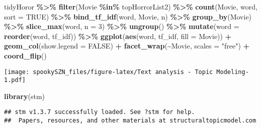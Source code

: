 \documentclass[
]{article}
\newenvironment{Shaded}{\begin{snugshade}}{\end{snugshade}}
\newcommand{\AttributeTok}[1]{\textcolor[rgb]{0.13,0.29,0.53}{#1}}
\newcommand{\ConstantTok}[1]{\textcolor[rgb]{0.56,0.35,0.01}{#1}}
\newcommand{\DecValTok}[1]{\textcolor[rgb]{0.00,0.00,0.81}{#1}}
\newcommand{\FunctionTok}[1]{\textcolor[rgb]{0.13,0.29,0.53}{\textbf{#1}}}
\newcommand{\NormalTok}[1]{#1}
\newcommand{\SpecialCharTok}[1]{\textcolor[rgb]{0.81,0.36,0.00}{\textbf{#1}}}
\newcommand{\StringTok}[1]{\textcolor[rgb]{0.31,0.60,0.02}{#1}}
\begin{document}
\begin{Shaded}
\begin{Highlighting}[]
\NormalTok{tidyHoror }\SpecialCharTok{\%\textgreater{}\%} 
  \FunctionTok{filter}\NormalTok{(Movie }\SpecialCharTok{\%in\%}\NormalTok{ topHorrorList2) }\SpecialCharTok{\%\textgreater{}\%} 
  \FunctionTok{count}\NormalTok{(Movie, word, }\AttributeTok{sort =} \ConstantTok{TRUE}\NormalTok{) }\SpecialCharTok{\%\textgreater{}\%} 
  \FunctionTok{bind\_tf\_idf}\NormalTok{(word, Movie, n) }\SpecialCharTok{\%\textgreater{}\%} 
  \FunctionTok{group\_by}\NormalTok{(Movie) }\SpecialCharTok{\%\textgreater{}\%} 
  \FunctionTok{slice\_max}\NormalTok{(word, }\AttributeTok{n =} \DecValTok{3}\NormalTok{) }\SpecialCharTok{\%\textgreater{}\%} 
  \FunctionTok{ungroup}\NormalTok{() }\SpecialCharTok{\%\textgreater{}\%} 
  \FunctionTok{mutate}\NormalTok{(}\AttributeTok{word =} \FunctionTok{reorder}\NormalTok{(word, tf\_idf)) }\SpecialCharTok{\%\textgreater{}\%} 
  \FunctionTok{ggplot}\NormalTok{(}\FunctionTok{aes}\NormalTok{(word, tf\_idf, }\AttributeTok{fill =}\NormalTok{ Movie)) }\SpecialCharTok{+} 
  \FunctionTok{geom\_col}\NormalTok{(}\AttributeTok{show.legend =} \ConstantTok{FALSE}\NormalTok{) }\SpecialCharTok{+} 
  \FunctionTok{facet\_wrap}\NormalTok{(}\SpecialCharTok{\textasciitilde{}}\NormalTok{Movie, }\AttributeTok{scales =} \StringTok{"free"}\NormalTok{) }\SpecialCharTok{+} 
  \FunctionTok{coord\_flip}\NormalTok{()}
\end{Highlighting}
\end{Shaded}

\texttt{[image: spookySZN\_files/figure-latex/Text analysis - Topic Modeling-1.pdf]}

\begin{Shaded}
\begin{Highlighting}[]
\FunctionTok{library}\NormalTok{(stm)}
\end{Highlighting}
\end{Shaded}

\begin{verbatim}
## stm v1.3.7 successfully loaded. See ?stm for help. 
##  Papers, resources, and other materials at structuraltopicmodel.com
\end{verbatim}
\end{document}
